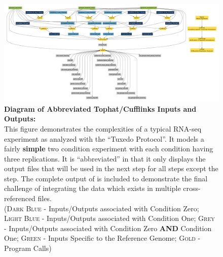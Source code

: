 

\begin{landscape}
 
 
 \begin{figure}[hp]
\centering
\includegraphics[width=\linewidth]{figures/figs/tuxedo_dot/707354_6/tophat_cufflinks_ins_outs.pdf}
\caption[Diagram of Abbreviated Tophat/Cufflinks Inputs and Outputs]{\textbf{Diagram of Abbreviated Tophat/Cufflinks Inputs and Outputs:}\\
	This figure demonstrates the complexities of a typical RNA-seq experiment as analyzed with the ``Tuxedo Protocol''. It models a fairly \textbf{simple} two condition experiment with each condition having three replications. It is ``abbreviated'' in that it only displays the output files that will be used in the next step for all steps except the  step. The complete output of  is included to demonstrate the final challenge of integrating the data which exists in multiple cross-referenced files.\\ 
	(\textsc{Dark Blue} - Inputs/Outputs associated with Condition Zero; 
	\textsc{Light Blue} - Inputs/Outputs associated with Condition One; 
	\textsc{Grey} - Inputs/Outputs associated with Condition Zero \textbf{AND} Condition One; 
	\textsc{Green} - Inputs Specific to the Reference Genome; 
	\textsc{Gold} - Program Calls)
}
	\label{fig:tuxedo}
\end{figure}
 
 
 
\end{landscape}

